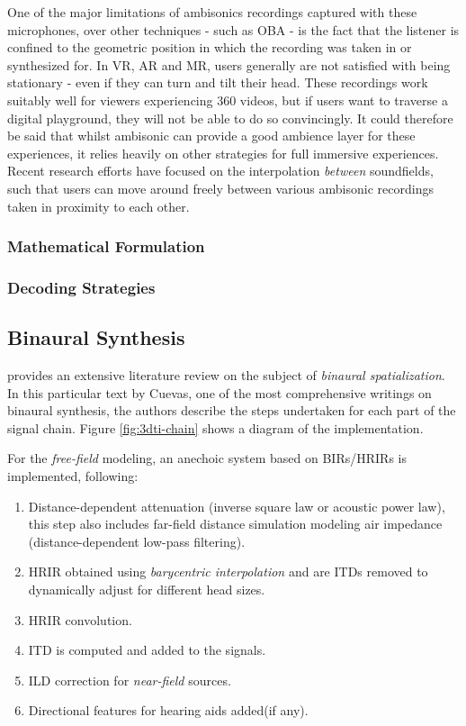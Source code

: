 One of the major limitations of ambisonics recordings captured with these microphones, over other techniques - such as OBA - is the fact that the listener is confined to the geometric position in which the recording was taken in or synthesized for. In VR, AR and MR, users generally are not satisfied with being stationary - even if they can turn and tilt their head. These recordings work suitably well for viewers experiencing 360 videos, but if users want to traverse a digital playground, they will not be able to do so convincingly. It could therefore be said that whilst ambisonic can provide a good ambience layer for these experiences, it relies heavily on other strategies for full immersive experiences. Recent research efforts have focused on the interpolation \textit{between} soundfields, such that users can move around freely between various ambisonic recordings taken in proximity to each other. 

\subsubsection{Mathematical Formulation}

\subsubsection{Decoding Strategies}


\subsection{Binaural Synthesis}
\label{subsec:bin-synth}

\cite{cuevas20193d} provides an extensive literature review on the subject of \textit{binaural spatialization}. In this particular text by Cuevas, one of the most comprehensive writings on binaural synthesis, the authors describe the steps undertaken for each part of the signal chain. Figure \ref{fig:3dti-chain} shows a diagram of the implementation. 

For the \textit{free-field} modeling, an anechoic system based on BIRs/HRIRs is implemented, following:


\begin{enumerate}
    \item Distance-dependent attenuation (inverse square law or acoustic power law), this step also includes far-field distance simulation modeling air impedance (distance-dependent low-pass filtering).
    \item HRIR obtained using \textit{barycentric interpolation} and are ITDs removed to dynamically adjust for different head sizes.
    \item HRIR convolution.
    \item ITD is computed and added to the signals.
    \item ILD correction for \textit{near-field} sources.
    \item Directional features for hearing aids added(if any).
\end{enumerate}

